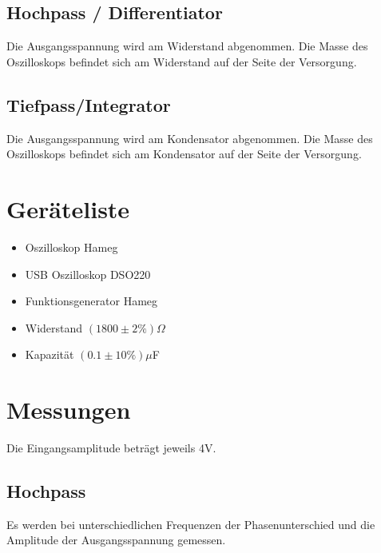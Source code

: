\documentclass[a4paper]{article}
\begin{document}
\subsection{Hochpass / Differentiator}
  Die Ausgangsspannung wird am Widerstand abgenommen. Die Masse des Oszilloskops befindet sich am Widerstand auf der Seite der Versorgung.
\subsection{Tiefpass/Integrator}
  Die Ausgangsspannung wird am Kondensator abgenommen. Die Masse des Oszilloskops befindet sich am Kondensator auf der Seite der Versorgung.

\section{Geräteliste}
\begin{itemize}
  \item Oszilloskop Hameg
  \item USB Oszilloskop DSO220
  \item Funktionsgenerator Hameg
  \item Widerstand $(1800\pm2\text{\%})\Omega$
  \item Kapazität $(0.1\pm10\text{\%})\mu$F
\end{itemize}

\section{Messungen}
Die Eingangsamplitude beträgt jeweils 4V.
\subsection{Hochpass}
Es werden bei unterschiedlichen Frequenzen der Phasenunterschied und die Amplitude der Ausgangsspannung gemessen.
\end{document}
